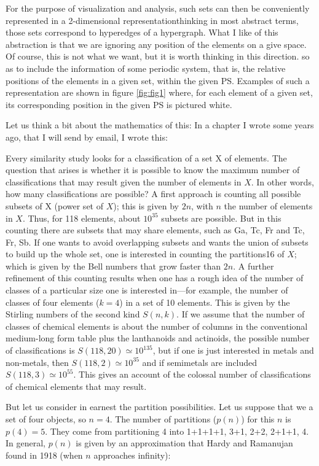 \documentclass[]{article}
\newcommand{\gr}[1]{{\color{red}#1}}
\begin{document}
For the purpose of visualization and analysis, such sets can then be conveniently represented in a 2-dimensional representation\gr{thinking in most abstract terms, those sets correspond to hyperedges of a hypergraph.  What I like of this abstraction is that we are ignoring any position of the elements on a give space.  Of course, this is not what we want, but it is worth thinking in this direction.} so as to include the information of some periodic system, that is, the relative positions of the elements in a given set, within the given PS. Examples of such a representation are shown in figure \ref{fig:fig1} where, for each element of a given set, its corresponding position in the given PS is pictured white. 

\gr{Let us think a bit about the mathematics of this:
In a chapter I wrote some years ago, that I will send by email, I wrote this:

Every similarity study looks for a classification of a set X of elements. The
question that arises is whether it is possible to know the maximum number of
classifications that may result given the number of elements in $X$. In other
words, how many classifications are possible? A first approach is counting all
possible subsets of X (power set of $X$); this is given by $2n$, with $n$ the number of
elements in $X$. Thus, for 118 elements, about $10^{35}$ subsets are possible. But in
this counting there are subsets that may share elements, such as {Ga, Tc, Fr}
and {Tc, Fr, Sb}. If one wants to avoid overlapping subsets and wants the
union of subsets to build up the whole set, one is interested in counting the
partitions16 of $X$; which is given by the Bell numbers that grow faster than $2n$.
A further refinement of this counting results when one has a rough idea of the
number of classes of a particular size one is interested in—for example, the number of classes of four elements ($k = 4$) in a set of 10 elements. This is
given by the Stirling numbers of the second kind $S(n,k)$. If we
assume that the number of classes of chemical elements is about the number
of columns in the conventional medium-long form table plus
the lanthanoids and actinoids, the possible number of classifications is $S(118,
20) \simeq 10^{135}$, but if one is just interested in metals and non-metals, then $S(118,
2) \simeq 10^{35}$ and if semimetals are included $S(118, 3) \simeq 10^{55}$. This gives an account
of the colossal number of classifications of chemical elements that may result.

But let us consider in earnest the partition possibilities.  Let us suppose that we a set of four objects, so $n=4$.  The number of partitions ($p(n)$) for this $n$ is $p(4)=5$.  They come from partitioning 4 into 1+1+1+1, 3+1, 2+2, 2+1+1, 4.  In general, $p(n)$ is given by an approximation that Hardy and Ramanujan found in 1918 (when $n$ approaches infinity):

}
\end{document}
